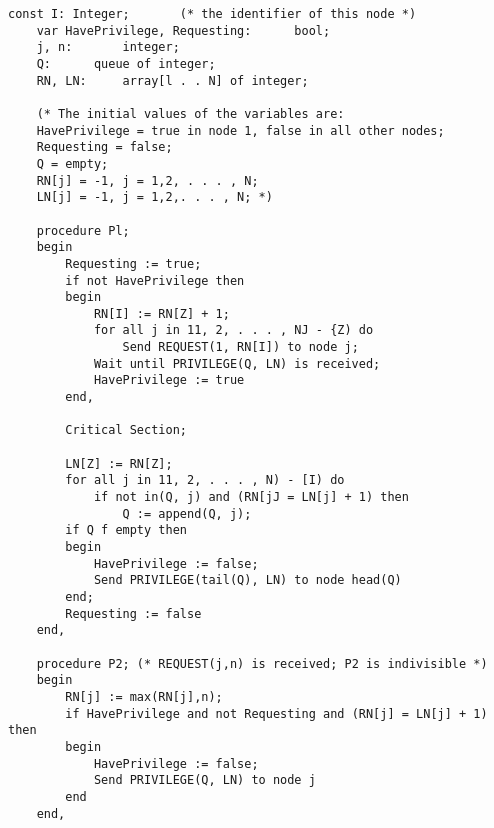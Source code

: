\documentclass[a4paper,12pt]{article}
\begin{document}
\begin{lstlisting}[label=some-code,caption=Suzuki and Kazami's algorithm]
const I: Integer;		(* the identifier of this node *)
	var HavePrivilege, Requesting:		bool;
	j, n:	 	integer;
	Q: 		queue of integer;
	RN, LN: 	array[l . . N] of integer;

	(* The initial values of the variables are:
	HavePrivilege = true in node 1, false in all other nodes;
	Requesting = false;
	Q = empty;
	RN[j] = -1, j = 1,2, . . . , N;
	LN[j] = -1, j = 1,2,. . . , N; *)

	procedure Pl;
	begin
		Requesting := true;
		if not HavePrivilege then
		begin
			RN[I] := RN[Z] + 1;
			for all j in 11, 2, . . . , NJ - {Z) do
				Send REQUEST(1, RN[I]) to node j;
			Wait until PRIVILEGE(Q, LN) is received;
			HavePrivilege := true
		end,
	
		Critical Section;

		LN[Z] := RN[Z];
		for all j in 11, 2, . . . , N) - [I) do
			if not in(Q, j) and (RN[jJ = LN[j] + 1) then
				Q := append(Q, j);
		if Q f empty then
		begin
			HavePrivilege := false;
			Send PRIVILEGE(tail(Q), LN) to node head(Q)
		end;
		Requesting := false
	end,

	procedure P2; (* REQUEST(j,n) is received; P2 is indivisible *)
	begin
		RN[j] := max(RN[j],n);
		if HavePrivilege and not Requesting and (RN[j] = LN[j] + 1) then
		begin
			HavePrivilege := false;
			Send PRIVILEGE(Q, LN) to node j
		end
	end,

\end{lstlisting}
\end{document}
